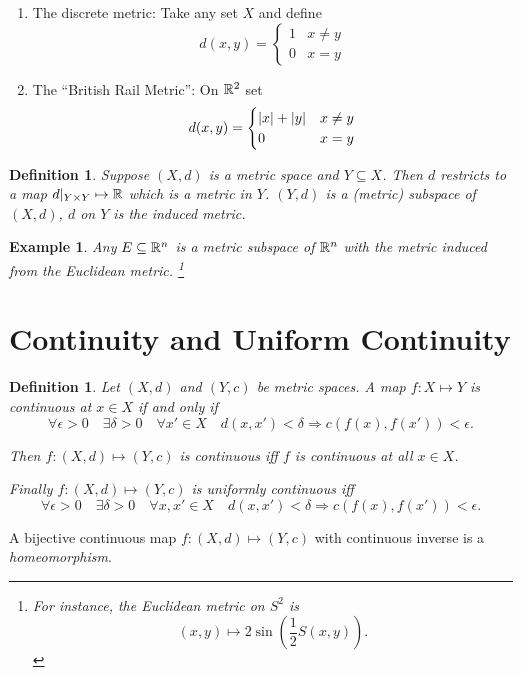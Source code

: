 \documentclass{notes}
\theoremstyle{plain}
\newtheorem{definition}[proposition]{Definition}
\newtheorem{example}[proposition]{Example}
\newcommand{\Forall}[1]{\forall #1 \quad}
\newcommand{\Exists}[1]{\exists #1 \quad}
\begin{document}
\begin{enumerate}
\item
The discrete metric: Take any set $ X $ and define
\[ d(x,y) = 
\begin{cases}
1& x \neq y \\
0& x=y
\end{cases} \]

\item The ``British Rail Metric'':
On $ \mathbb{R}^{2} $ set
\[ d(x,y) = \begin{cases}
\left|x\right|+\left|y\right|& x \neq y \\
0& x=y
\end{cases} \]

\end{enumerate}


\begin{definition}
Suppose $ (X,d) $ is a metric space and $ Y \subseteq X $. Then $ 
d $ restricts to a map $ d|_{Y\times Y}\mapsto \mathbb{R} $ which is a 
metric in $ Y $. $ (Y,d) $ is a \emph{(metric) subspace} of $ 
(X,d) $, $ d $ on $ Y $ is the \emph{induced metric}.
\end{definition}

\begin{example}
Any $ E \subseteq \mathbb{R}^{n} $ is a metric subspace of $\mathbb{R}^n$ with the metric 
induced from the Euclidean metric.%
\footnote{For instance, the Euclidean metric on $ S^{2} $ is
\[ (x,y) \mapsto 2 \sin\left( \frac{1}{2}S(x,y) \right). \]}
\end{example}

\section{Continuity and Uniform Continuity}


\begin{definition}
Let $ (X,d) $ and $ (Y,c) $ be metric spaces.
A map $ f\colon X \mapsto Y $ is continuous at $x \in X$ if and only if
\[
\Forall{\epsilon>0} \Exists{\delta>0} \Forall{x' \in X} d(x,x')< 
\delta \Rightarrow c(f(x),f(x'))< \epsilon.
\]

Then $ f\colon (X,d)\mapsto (Y,c) $ is continuous iff $ f $ is 
continuous at all $ x \in X $.

Finally $ f\colon (X,d) \mapsto (Y,c) $ is uniformly continuous iff
\[ \Forall{\epsilon>0} \Exists{\delta>0} \Forall{x,x' \in X} 
d(x,x')<\delta \Rightarrow c(f(x),f(x'))<\epsilon. \]
\end{definition}

A bijective continuous map $ f\colon (X,d) \mapsto (Y,c) $ with 
continuous inverse is a \emph{homeomorphism}.
\end{document}
